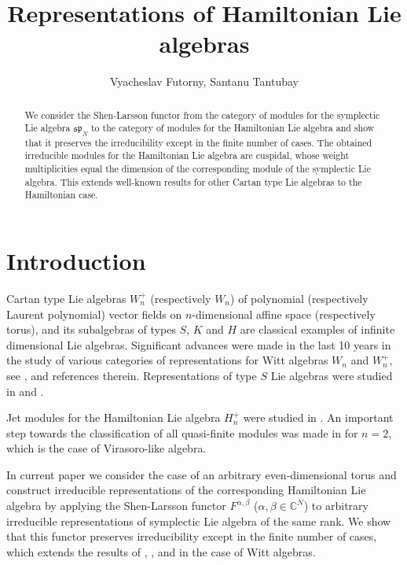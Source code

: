 \documentclass[a4paper,11pt]{amsart}
\numberwithin{equation}{section}
\theoremstyle{plain}
\newcommand{\C}{\mathbb{C}}
\newcommand{\s}{\mathfrak{sp}_{N}}
\begin{document}
		\title[Representations of  Hamiltonian Lie algebras]{Representations of  Hamiltonian Lie algebras} 
\author{Vyacheslav Futorny, Santanu Tantubay}
\address{Shenzhen International Center for Mathematics, Southern University of Science and Technology, China}
	\maketitle
	\begin{abstract}
	    We consider the Shen-Larsson functor from the category of   modules for the symplectic Lie algebra $\s$ to the category of  modules for the Hamiltonian Lie algebra and show that it preserves the irreducibility except in the finite number of cases. The obtained irreducible modules for the Hamiltonian Lie algebra are cuspidal, whose weight multiplicities equal the dimension of the corresponding module of the symplectic Lie algebra. This extends well-known results for other Cartan type Lie algebras to the Hamiltonian case.\\
        
	\end{abstract}
	\section{Introduction}
Cartan type Lie algebras $W_n^+$ (respectively $W_n$) 
of polynomial (respectively Laurent polynomial) vector fields on $n$-dimensional affine space  (respectively torus), and its subalgebras of types $S$, $K$ and $H$ are classical examples of infinite dimensional Lie algebras. Significant advances were made in the last 10 years in the study of various categories of representations for Witt algebras $W_n$ and $W_n^+$, see \cite{BF16}, \cite{XL23} and references therein. Representations of type $S$ Lie algebras were studied in \cite{BT} and \cite{DGYZ19}.  

Jet modules for the Hamiltonian Lie algebra $H^+_n$ were studied in \cite{T18}. An important step towards the classification of all quasi-finite modules was made in \cite{JL} for $n=2$, which is the case of Virasoro-like algebra.  

In current paper we consider the case of an arbitrary even-dimensional torus and construct irreducible representations of the corresponding Hamiltonian Lie algebra 
by applying the Shen-Larsson functor $F^{\alpha,\beta}$ ($\alpha,\beta\in \C^N$) to arbitrary irreducible representations of symplectic Lie algebra of the same rank. We show that this functor preserves irreducibility except in the finite number of cases, which extends the results of \cite{R96}, \cite{GZ11}, \cite{LZ15} and \cite{Ru} in the case of  Witt algebras.
\end{document}
